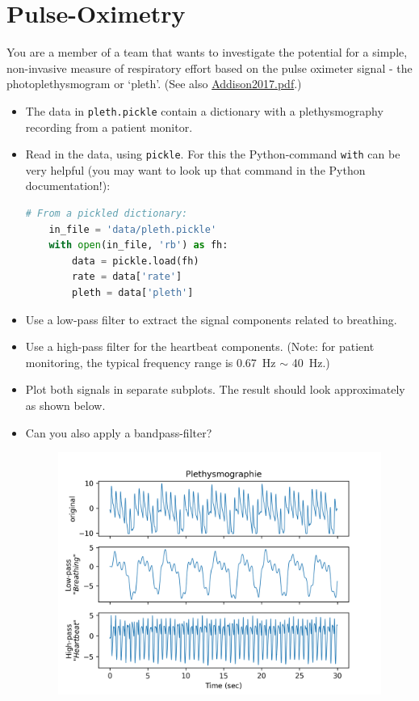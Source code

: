 \documentclass[12pt]{article}
\begin{document}
\section{Pulse-Oximetry}

You are a member of a team that wants to investigate the potential for a simple,
non-invasive measure of respiratory effort based on the pulse oximeter signal -
the photoplethysmogram or ‘pleth’. (See also
\href{run:Addison2017.pdf}{Addison2017.pdf}.)

\begin{itemize}
    \item The data in \lstinline{pleth.pickle} contain a dictionary with a
        plethysmography recording from a patient monitor.

    \item Read in the data, using \lstinline{pickle}. For this the Python-command
        \texttt{with} can be very  helpful (you may want to look up that command
        in the Python documentation!):

    \begin{lstlisting}[language=python]
    # From a pickled dictionary:
    in_file = 'data/pleth.pickle'
    with open(in_file, 'rb') as fh:
        data = pickle.load(fh)
        rate = data['rate']
        pleth = data['pleth']
    \end{lstlisting}



    \item Use a low-pass filter to extract the signal components related to
        breathing.

    \item Use a high-pass filter for the heartbeat components. (Note: for
    patient monitoring, the typical frequency range is \SI{0.67}{Hz} $\sim$ 
    \SI{40}{Hz}.)

    \item Plot both signals in separate subplots. The result should look
        approximately as shown below.

    \item Can you also apply a bandpass-filter?
\begin{figure}[H]
    \centering
    \includegraphics[width=0.75\linewidth]{Resources/img/pleth.png}
\end{figure}

\end{itemize}
\end{document}
